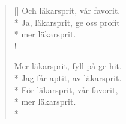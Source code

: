 \begin{verse}[\versewidth]
Och läkarsprit, vår favorit.\\*
Ja, läkarsprit, ge oss profit\\*
mer läkarsprit.\\!

Mer läkarsprit, fyll på ge hit.\\*
Jag får aptit, av läkarsprit.\\*
För läkarsprit, vår favorit,\\*
mer läkarsprit.\\*




\end{verse}

